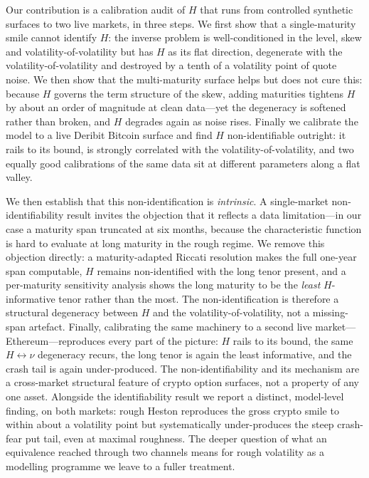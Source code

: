 \documentclass[11pt]{article}
\begin{document}
Our contribution is a calibration audit of $H$ that runs from controlled synthetic surfaces to two
live markets, in three steps. We first show that a single-maturity smile cannot identify $H$: the
inverse problem is well-conditioned in the level, skew and volatility-of-volatility but has $H$ as
its flat direction, degenerate with the volatility-of-volatility and destroyed by a tenth of a
volatility point of quote noise. We then show that the multi-maturity surface helps but does not
cure this: because $H$ governs the term structure of the skew, adding maturities tightens $H$ by
about an order of magnitude at clean data---yet the degeneracy is softened rather than broken, and
$H$ degrades again as noise rises. Finally we calibrate the model to a live Deribit Bitcoin surface
and find $H$ non-identifiable outright: it rails to its bound, is strongly correlated
with the volatility-of-volatility, and two equally good calibrations of the same data sit at different parameters along a
flat valley.

We then establish that this non-identification is \emph{intrinsic}. A single-market
non-identifiability result invites the objection that it reflects a data limitation---in
our case a maturity span truncated at six months, because the characteristic function is
hard to evaluate at long maturity in the rough regime. We remove this objection directly:
a maturity-adapted Riccati resolution makes the full one-year span computable, $H$ remains
non-identified with the long tenor present, and a per-maturity sensitivity analysis shows
the long maturity to be the \emph{least} $H$-informative tenor rather than the most. The
non-identification is therefore a structural degeneracy between $H$ and the
volatility-of-volatility, not a missing-span artefact. Finally, calibrating the same
machinery to a second live market---Ethereum---reproduces every part of the picture: $H$
rails to its bound, the same $H\leftrightarrow\nu$ degeneracy recurs,
the long tenor is again the least informative, and the crash tail is again under-produced.
The non-identifiability and its mechanism are a cross-market structural feature of crypto
option surfaces, not a property of any one asset. Alongside the identifiability result we
report a distinct, model-level finding, on both markets: rough Heston reproduces the gross
crypto smile to within about a volatility point but systematically under-produces the steep
crash-fear put tail, even at maximal roughness. The deeper question of what an equivalence
reached through two channels means for rough volatility as a modelling programme we leave to
a fuller treatment.
\end{document}
